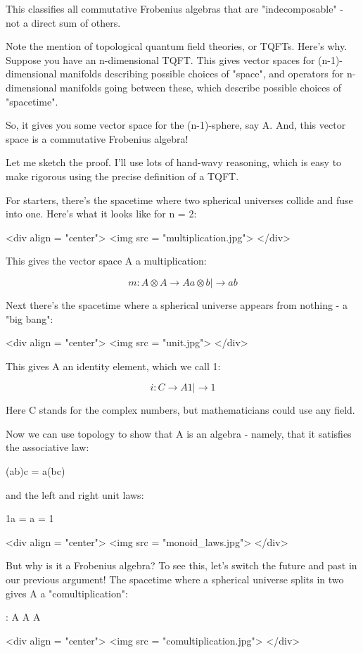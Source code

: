 This classifies all commutative Frobenius algebras that are
"indecomposable" - not a direct sum of others.

Note the mention of topological quantum field theories, or TQFTs.
Here's why.  Suppose you have an n-dimensional TQFT.  This gives
vector spaces for (n-1)-dimensional manifolds describing possible
choices of "space", and operators for n-dimensional
manifolds going between these, which describe possible choices of
"spacetime".

So, it gives you some vector space for the (n-1)-sphere, say A.  
And, this vector space is a commutative Frobenius algebra!  

Let me sketch the proof.  I'll use lots of hand-wavy reasoning,
which is easy to make rigorous using the precise definition of
a TQFT.  

For starters, there's the spacetime where two spherical universes 
collide and fuse into one.  Here's what it looks like for n = 2:

<div align = "center">
<img src = "multiplication.jpg">
</div>

This gives the vector space A a multiplication: 

$$
m: A \otimes  A  \to  A
   a \otimes  b |\to  ab
$$
    
Next there's the spacetime where a spherical universe appears 
from nothing - a "big bang":

<div align = "center">
<img src = "unit.jpg">
</div>

This gives A an identity element, which we call 1:

$$
i: C  \to  A
   1 |\to  1
$$
    
Here C stands for the complex numbers, but mathematicians could
use any field. 

Now we can use topology to show that A is an algebra - namely, 
that it satisfies the associative law:

(ab)c = a(bc) 

and the left and right unit laws: 

1a = a = 1

<div align = "center">
<img src = "monoid_laws.jpg">
</div>

But why is it a Frobenius algebra?  To see this, let's switch the 
future and past in our previous argument!  The spacetime where 
a spherical universe splits in two gives A a "comultiplication":

\Delta : A \to  A \otimes  A

<div align = "center">
<img src = "comultiplication.jpg">
</div>


